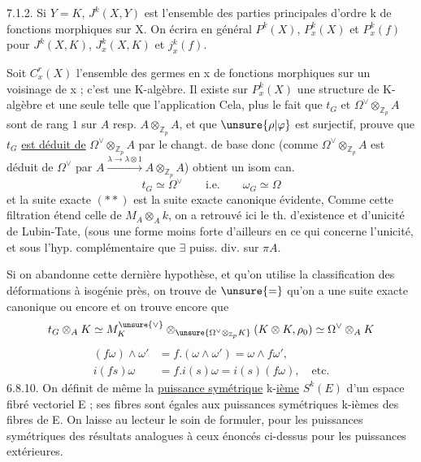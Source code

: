 7.1.2. Si $Y=K$, $J^k(X,Y)$ est l'ensemble des parties principales d'ordre k de fonctions morphiques sur X. On écrira en général $P^k(X)$, $P_x^k(X)$ et $P_x^k(f)$ pour $J^k(X,K)$, $J_x^k(X,K)$ et $j_x^k(f)$.

Soit $C_x^r(X)$ l'ensemble des germes en x de fonctions morphiques sur un voisinage de x ; c'est une K-algèbre. Il existe sur $P_x^k(X)$ une structure de K-algèbre et une seule telle que l'application
Cela, plus le fait que $t_G$ et $\Omega^{\vee}\otimes_{\mathbb Z_p}A$ sont de rang $1$ sur $A$ resp. $A\otimes_{\mathbb Z_p}A$, et que $\unsure{\rho|\varphi}$ est surjectif, prouve que $t_G$ \uline{est déduit de} $\Omega^{\vee}\otimes_{\mathbb Z_p}A$ par le changt. de base
donc  (comme $\Omega^{\vee}\otimes_{\mathbb Z_p}A$ est déduit de $\Omega^{\vee}$ par $A\xrightarrow{\lambda\longrightarrow\lambda\otimes1}A\otimes_{\mathbb Z_p}A$)  obtient un isom can.
\[
t_G\simeq\Omega^{\vee}\qquad\text{i.e.}\qquad\omega_G\simeq\Omega
\]
et la suite exacte $(**)$ est la suite exacte canonique évidente,  Comme cette filtration étend celle de $M_A\otimes_A k$, on a retrouvé ici le th. d'existence et d'unicité de Lubin-Tate, (sous une forme moins forte d'ailleurs en ce qui concerne l'unicité, et sous l'hyp. complémentaire que $\exists$ puiss. div. sur $\pi A$.

Si on abandonne cette dernière hypothèse, et qu'on utilise la classification des déformations à isogénie près, on trouve de $\unsure{=}$ qu'on a une suite exacte canonique
ou encore
et on trouve encore que
\[
t_G\otimes_A K\simeq M_K^{\unsure{\vee}}\otimes_{\unsure{\Omega^{\vee}\otimes_{\mathbb Z_p}K}}(K\otimes K,\rho_0)\simeq\Omega^{\vee}\otimes_A K
\]
\[
\begin{aligned}
(f\omega)\wedge\omega'&=f.(\omega\wedge\omega')=\omega\wedge f\omega',\\
i(fs)\omega&=f.i(s)\omega=i(s)(f\omega),\quad\text{etc.}
\end{aligned}
\]
6.8.10. On définit de même la \uline{puissance symétrique} k-\uline{ième} $S^k(E)$ d'un espace fibré vectoriel E ; ses fibres sont égales aux puissances symétriques k-ièmes des fibres de E. On laisse au lecteur le soin de formuler, pour les puissances symétriques des résultats analogues à ceux énoncés ci-dessus pour les puissances extérieures.

